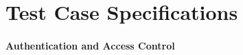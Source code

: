 \section{Test Case Specifications}
\label{appendix:testcases}

\begingroup
\small
\renewcommand{\arraystretch}{1.12}


\paragraph{Authentication and Access Control}

